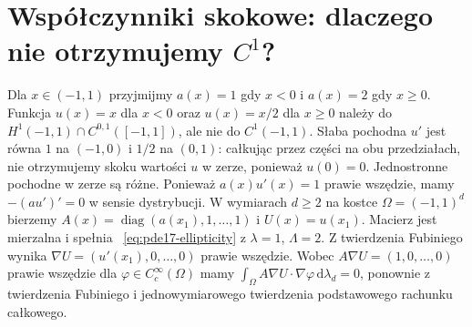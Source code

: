 \section[Współczynniki skokowe i nieciągłość pochodnych]{Współczynniki skokowe: dlaczego nie otrzymujemy $C^1$?}
\label{sec:pde17-counterexample}
\begin{kontrprzyklad}
Dla $x\in(-1,1)$ przyjmijmy $a(x)=1$ gdy $x<0$ i
$a(x)=2$ gdy $x\ge0$. Funkcja
$u(x)=x$ dla $x<0$ oraz $u(x)=x/2$ dla $x\ge0$ należy do
$H^1(-1,1)\cap C^{0,1}([-1,1])$, ale nie do $C^1(-1,1)$.
Słaba pochodna $u'$ jest równa $1$ na $(-1,0)$ i $1/2$
na $(0,1)$: całkując przez części na obu przedziałach,
nie otrzymujemy skoku wartości $u$ w zerze, ponieważ $u(0)=0$.
Jednostronne pochodne w zerze są różne.
Ponieważ $a(x)u'(x)=1$ prawie wszędzie, mamy
$-(au')'=0$ w sensie dystrybucji. W wymiarach $d\ge2$
na kostce $\Omega=(-1,1)^d$ bierzemy
$A(x)=\operatorname{diag}(a(x_1),1,\ldots,1)$ i
$U(x)=u(x_1)$. Macierz jest mierzalna i spełnia
~\eqref{eq:pde17-ellipticity} z $\lambda=1$, $\Lambda=2$.
Z twierdzenia Fubiniego wynika
$\nabla U=(u'(x_1),0,\ldots,0)$ prawie wszędzie.
Wobec $A\nabla U=(1,0,\ldots,0)$ prawie wszędzie
dla $\varphi\in C_c^\infty(\Omega)$ mamy
$\int_\Omega A\nabla U\cdot\nabla\varphi\,\mathrm d\lambda_d=0$,
ponownie z twierdzenia Fubiniego i jednowymiarowego
twierdzenia podstawowego rachunku całkowego.
\end{kontrprzyklad}

